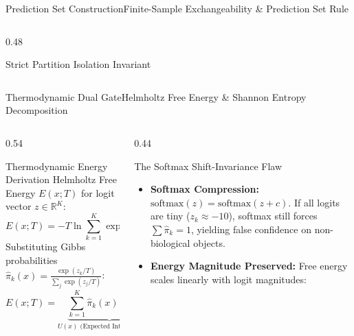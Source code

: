 \begin{frame}{Prediction Set Construction}{Finite-Sample Exchangeability \& Prediction Set Rule}
\begin{columns}[T]
\begin{column}{0.48\textwidth}
\begin{block}{Strict Partition Isolation Invariant}
            \end{block}
        \end{column}
    \end{columns}
\end{frame}

\begin{frame}{Thermodynamic Dual Gate}{Helmholtz Free Energy \& Shannon Entropy Decomposition}
    \vspace{-0.25cm}
    \begin{columns}[T]
        \begin{column}{0.54\textwidth}
            \begin{block}{Thermodynamic Energy Derivation}\scriptsize
                Helmholtz Free Energy $E(x; T)$ for logit vector $z \in \mathbb{R}^K$:
                \[
                    E(x; T) = -T \ln \sum_{k=1}^K \exp\left(\frac{z_k}{T}\right)
                \]
                Substituting Gibbs probabilities $\hat{\pi}_k(x) = \frac{\exp(z_k/T)}{\sum_j \exp(z_j/T)}$:
                \[
                    E(x; T) = \underbrace{\sum_{k=1}^K \hat{\pi}_k(x)(-z_k)}_{U(x) \text{ (Expected Internal Energy)}} - T \cdot \underbrace{\left(-\sum_{k=1}^K \hat{\pi}_k(x)\ln \hat{\pi}_k(x)\right)}_{H(\hat{\pi}) \text{ (Shannon Entropy)}}
                \]
            \end{block}
        \end{column}
        \begin{column}{0.44\textwidth}
            \begin{block}{The Softmax Shift-Invariance Flaw}\scriptsize
                \begin{itemize}\setlength{\itemsep}{2pt}
                    \item \textbf{Softmax Compression:} $\text{softmax}(z) = \text{softmax}(z + c)$. If all logits are tiny ($z_k \approx -10$), softmax still forces $\sum \hat{\pi}_k = 1$, yielding false confidence on non-biological objects.
                    \item \textbf{Energy Magnitude Preserved:} Free energy scales linearly with logit magnitudes:

\end{itemize}
\end{block}
\end{column}
\end{columns}
\end{frame}
